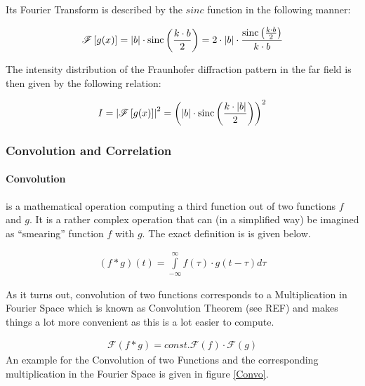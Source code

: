 Its Fourier Transform is described by the $sinc$ function in the following manner:

\begin{align}
\mathscr{F}\left[ g(x) \right] = \left| b\right| \cdot \mathrm{sinc}\left( \frac{k \cdot b}{2}\right)  = 2 \cdot \left| b\right| \cdot \frac{\mathrm{sinc}\left( \frac{k \cdot b}{2}\right)}{k \cdot b}
\end{align}


The intensity distribution of the Fraunhofer diffraction pattern in the far field is then given by the following relation:

\begin{align}
I = \left| \mathscr{F}\left[ g(x) \right]\right| ^2 = \left( \left| b\right| \cdot \mathrm{sinc}\left( \frac{k \cdot \left| b\right| }{2} \right) \right) ^2
\end{align}




\subsubsection{Convolution and Correlation}

\paragraph{Convolution} is a mathematical operation computing a third function out of two functions $f$ and $g$. It is a rather complex operation that can (in a simplified way) be imagined as ``smearing'' function $f$ with $g$. The exact definition is is given below.

\begin{align}
(f*g)(t)=\int\limits_{-\infty}^{\infty} f(\tau)\cdot g(t-\tau) d\tau \label{Convo1}
\end{align}

As it turns out, convolution of two functions corresponds to a Multiplication in Fourier Space which is known as Convolution Theorem (see REF) and makes things a lot more convenient as this is a lot easier to compute.

\begin{align}
\mathscr{F}(f*g)=const. \mathscr{F}(f)\cdot \mathscr{F}(g)
\end{align}
 An example for the Convolution of two Functions and the corresponding multiplication in the Fourier Space is given in figure \ref{Convo}.
 
